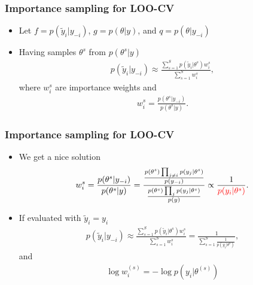 \documentclass[10pt]{beamer}
\begin{document}
\begin{frame}
  \frametitle{Importance sampling for LOO-CV}

   \begin{itemize}
   \item Let $f = p(\tilde{y}_i|y_{-i})$, $g = p(\theta|y)$, and $q = p(\theta|y_{-i})$
   \pause
   \item Having samples $\theta^s$ from $p(\theta^s|y)$
     \begin{align*}
       p(\tilde{y}_i|y_{-i})\approx\frac{\sum_{s=1}^S p(\tilde{y}_i|\theta^s) w_i^s}{\sum_{s=1}^S w_i^s},
     \end{align*}
     where $w_i^s$ are importance weights and
     \begin{align*}
       w_i^s=\frac{p(\theta^s|y_{-i})}{p(\theta^s|y)}.
     \end{align*}
   \end{itemize}

 \end{frame}

\begin{frame}
  \frametitle{Importance sampling for LOO-CV}

   \begin{itemize}
   \item We get a nice solution
     \begin{align*}
       w_i^s=\frac{p(\theta^s|y_{-i})}{p(\theta^s|y)} = \frac{\frac{p(\theta^s) \prod_{j \neq i} p(y_j | \theta^s)}{p(y_{-i})}}{\frac{p(\theta^s) \prod_j p(y_j | \theta^s)}{p(y)}}\propto\frac{1}{\color{red} p(y_i|\theta^s)}.
     \end{align*}
 \pause
   \item If evaluated with $\tilde{y}_i=y_i$
        \begin{align*}
       p(\tilde{y}_i|y_{-i})\approx\frac{\sum_{s=1}^S p(\tilde{y}_i|\theta^s) w_i^s}{\sum_{s=1}^S w_i^s} = \frac{1}{\sum_{s=1}^S\frac{1}{p(y_i|\theta^s)}},
     \end{align*}
     and
    \begin{align*}
       \log w^{(s)}_i = - \log p(y_i|\theta^{(s)}) %
    \end{align*}
   \end{itemize}
 \end{frame}
\end{document}
